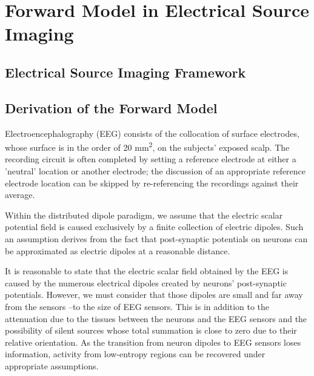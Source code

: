 \chapter{Forward Model in Electrical Source Imaging}
\label{ch:forward}

\section{Electrical Source Imaging Framework}




\section{Derivation of the Forward Model}

Electroencephalography (EEG) consists of the collocation of surface electrodes, whose surface is in the order of 20 \si{mm^2}, on the subjects' exposed scalp.
%
The recording circuit is often completed by setting a reference electrode at either a 'neutral' location or another electrode; the discussion of an appropriate reference electrode location can be skipped by re-referencing the recordings against their average.

Within the distributed dipole paradigm, we assume that the electric scalar potential field is caused exclusively by a finite collection of electric dipoles. 
%
Such an assumption derives from the fact that post-synaptic potentials on neurons can be approximated as electric dipoles at a reasonable distance.

It is reasonable to state that the electric scalar field obtained by the EEG is caused by the numerous electrical dipoles created by neurons' post-synaptic potentials.
%
However, we must consider that those dipoles are small and far away from the sensors --to the size of EEG sensors.
%
This is in addition to the attenuation due to the tissues between the neurons and the EEG sensors and the possibility of silent sources whose total summation is close to zero due to their relative orientation.
%
As the transition from neuron dipoles to EEG sensors loses information, activity from low-entropy regions can be recovered under appropriate assumptions.

